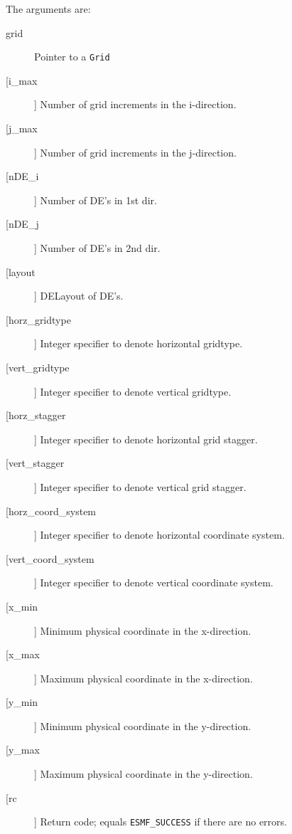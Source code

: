        The arguments are:
       \begin{description}
       \item[grid]
            Pointer to a {\tt Grid}
       \item[[i\_max]]
            Number of grid increments in the i-direction.
       \item[[j\_max]]
            Number of grid increments in the j-direction.
       \item[[nDE\_i]]
            Number of DE's in 1st dir.
       \item[[nDE\_j]]
            Number of DE's in 2nd dir.
       \item[[layout]]
           DELayout of DE's.
       \item[[horz\_gridtype]]
            Integer specifier to denote horizontal gridtype.
       \item[[vert\_gridtype]]
            Integer specifier to denote vertical gridtype.
       \item[[horz\_stagger]]
            Integer specifier to denote horizontal grid stagger.
       \item[[vert\_stagger]]
            Integer specifier to denote vertical grid stagger.
       \item[[horz\_coord\_system]]
            Integer specifier to denote horizontal coordinate system.
       \item[[vert\_coord\_system]]
            Integer specifier to denote vertical coordinate system.
       \item[[x\_min]]
            Minimum physical coordinate in the x-direction.
       \item[[x\_max]]
            Maximum physical coordinate in the x-direction.
       \item[[y\_min]]
            Minimum physical coordinate in the y-direction.
       \item[[y\_max]]
            Maximum physical coordinate in the y-direction.
       \item[[rc]]
            Return code; equals {\tt ESMF\_SUCCESS} if there are no errors.
       \end{description}
  
\begin{verbatim} \end{verbatim}
 
 
\mbox{}\hrulefill\ 
 

